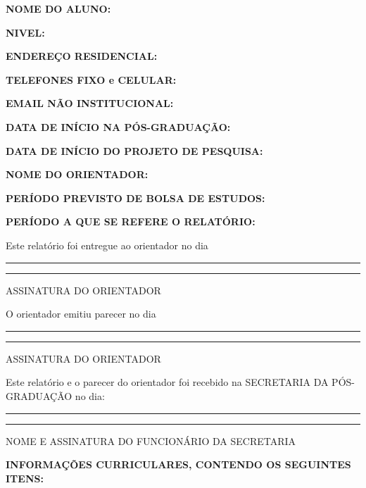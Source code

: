 \documentclass[12pt,a4paper]{article}
\begin{document}
\begin{flushleft}

{\bfseries
NOME DO ALUNO:
}

{\bfseries
NIVEL:
}

{\bfseries
ENDEREÇO RESIDENCIAL:
}

{\bfseries
TELEFONES FIXO e CELULAR:
}

{\bfseries
EMAIL NÃO INSTITUCIONAL:
}

{\bfseries
DATA DE INÍCIO NA PÓS-GRADUAÇÃO:
}

{\bfseries
DATA DE INÍCIO DO PROJETO DE PESQUISA:
}

{\bfseries
NOME DO ORIENTADOR:
}

{\bfseries
PERÍODO PREVISTO DE BOLSA DE ESTUDOS:
}

{\bfseries
PERÍODO A QUE SE REFERE O RELATÓRIO:
}

\vfill

{\small Este relatório foi entregue ao orientador no dia}
\rule{1.5cm}{0.4pt}
\hfill
\rule{4cm}{0.4pt}

\vspace{-0.2cm}

\hfill {\tiny ASSINATURA DO ORIENTADOR}

\vspace{0.5cm}

{\small O orientador emitiu parecer no dia}
\rule{1.5cm}{0.4pt}
\hfill
\rule{4cm}{0.4pt}

\vspace{-0.2cm}
\hfill {\tiny ASSINATURA DO ORIENTADOR}

\vspace{0.5cm}

{\small Este relatório e o parecer do orientador foi recebido na
SECRETARIA DA PÓS-GRADUAÇÃO no dia:}

\vspace{0.5cm}

\rule{3cm}{0.4pt}
\hfill
\rule{10cm}{0.4pt}

\vspace{-0.2cm}

\hfill {\tiny NOME E ASSINATURA DO FUNCIONÁRIO DA SECRETARIA}

\end{flushleft}

\newpage

\begin{center}
\textbf{\large INFORMAÇÕES CURRICULARES, CONTENDO OS SEGUINTES ITENS:}
\end{center}
\end{document}
